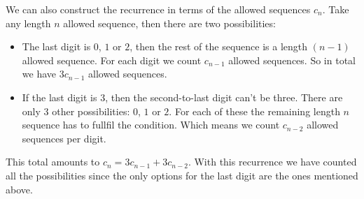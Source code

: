 \documentclass[12pt]{memoir}
\begin{document}
\begin{ptcb}
   We can also construct the recurrence in terms of the allowed sequences $c_n$. Take any length $n$ allowed sequence, then there are two possibilities:
   \begin{itemize}
      \itemsep=-0.4em
      \item The last digit is $0$, $1$ or $2$, then the rest of the sequence is a length $(n-1)$ allowed sequence. For each digit we count $c_{n-1}$ allowed sequences. So in total we have $3c_{n-1}$ allowed sequences.
      \item If the last digit is $3$, then the second-to-last digit can't be three. There are only $3$ other possibilities: $0$, $1$ or $2$. For each of these the remaining length $n$ sequence has to fullfil the condition. Which means we count $c_{n-2}$ allowed sequences per digit.
   \end{itemize}
   This total amounts to $c_n=3c_{n-1}+3c_{n-2}$. With this recurrence we have counted all the possibilities since the only options for the last digit are the ones mentioned above. 
\end{ptcb}
\end{document}
